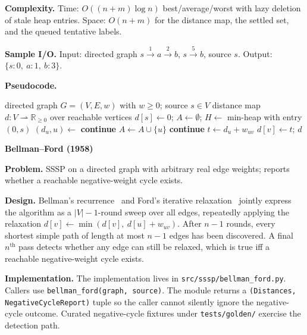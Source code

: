 \documentclass[12pt]{article}
\begin{document}
\textbf{Complexity.} Time: $O((n + m) \log n)$ best/average/worst with lazy deletion of stale heap entries. Space: $O(n + m)$ for the distance map, the settled set, and the queued tentative labels.
\medskip

\textbf{Sample I/O.} Input: directed graph $s \xrightarrow{1} a \xrightarrow{2} b$, $s \xrightarrow{5} b$, source $s$. Output: $\{s : 0,\ a : 1,\ b : 3\}$.

\newpage
\noindent\textbf{Pseudocode.}

\begin{algorithm}[H]
\caption{Dijkstra (binary-heap variant)}
\begin{algorithmic}[1]
\Require directed graph $G = (V, E, w)$ with $w \ge 0$; source $s \in V$
\Ensure distance map $d : V \rightharpoonup \mathbb{R}_{\ge 0}$ over reachable vertices
\State $d[s] \gets 0$; $A \gets \emptyset$; $H \gets$ min-heap with entry $(0, s)$ 
  \State $(d_u, u) \gets$ 
   \State \textbf{continue} 
  \EndIf
  \State $A \gets A \cup \{u\}$
     \State \textbf{continue} \EndIf
    \State $t \gets d_u + w_{uv}$
      \State $d[v] \gets t$; 
    \EndIf
  \EndFor
\EndWhile
\State \Return $d$
\end{algorithmic}
\end{algorithm}

\newpage
\noindent\textbf{Bellman--Ford (1958)}\label{sec:algo-bellman-ford}
\medskip

\textbf{Problem.} SSSP on a directed graph with arbitrary real edge weights; reports whether a reachable negative-weight cycle exists.
\medskip

\textbf{Design.} Bellman's recurrence~\cite{bellman1958routing} and Ford's iterative relaxation~\cite{ford1956network} jointly express the algorithm as a $|V| - 1$-round sweep over all edges, repeatedly applying the relaxation $d[v] \gets \min(d[v],\ d[u] + w_{uv})$. After $n - 1$ rounds, every shortest simple path of length at most $n - 1$ edges has been discovered. A final $n^{\text{th}}$ pass detects whether any edge can still be relaxed, which is true iff a reachable negative-weight cycle exists.
\medskip

{\raggedright\setlength{\parindent}{0.5in}
\indent\textbf{Implementation.} The implementation lives in \texttt{src/sssp/bellman\_ford.py}. Callers use \texttt{bellman\_ford(graph, source)}. The module returns a \texttt{(Distances, NegativeCycleReport)} tuple so the caller cannot silently ignore the negative-cycle outcome. Curated negative-cycle fixtures under \texttt{tests/golden/} exercise the detection path.
\par}
\medskip
\end{document}

